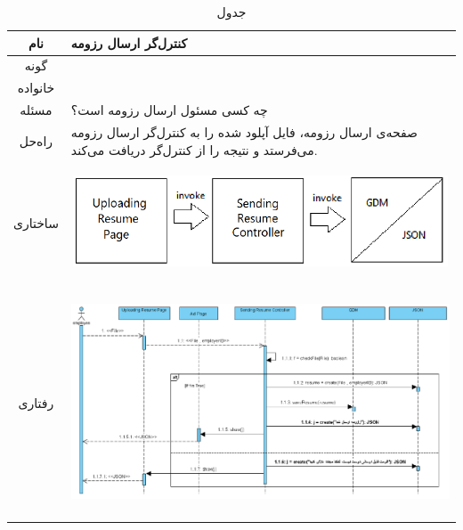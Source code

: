 \begin{table}[H]
	\begin{adjustbox}{width=\textwidth}
		\begin{tabular}{|c|p{\textwidth}|}
			\hline
			نام &
			کنترل‌گر ارسال رزومه\\ 
			\hline
			گونه & 
			\grasp \\
			\hline
			خانواده &
			\controller \\
			\hline
			مسئله & 
			چه کسی مسئول ارسال رزومه است؟\\
			\hline
			راه‌حل& 
			صفحه‌ی ارسال رزومه، فایل آپلود شده را به کنترل‌گر ارسال رزومه می‌فرستد و نتیجه‌ را از کنترل‌گر دریافت می‌کند. \\
			\hline
			ساختاری & 
			\begin{minipage}{\textwidth}
				\begin{flushleft}
					\begin{minipage}{\textwidth}
						\includegraphics[width=13cm, height=2.7cm]{./images/7-6-1}
					\end{minipage}
				\end{flushleft}
			\end{minipage}
			
			\\
			\hline
			رفتاری & 
			\begin{minipage}{\textwidth}
				\begin{flushleft}
					\begin{minipage}{\textwidth}
						\includegraphics[width=13.5cm, height=6cm]{./images/7-6-2}
					\end{minipage}
				\end{flushleft}
			\end{minipage}
			\\
			\hline
		\end{tabular}
	\end{adjustbox}
	\caption{جدول }
	\label{table-with-pic:6}
\end{table}

